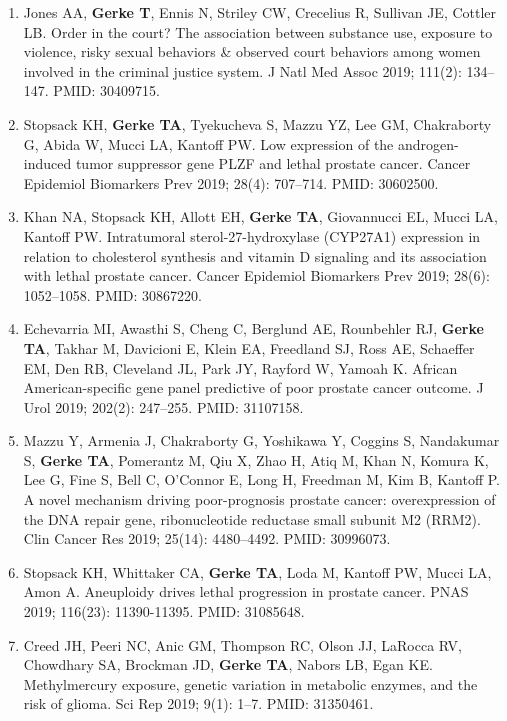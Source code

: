 \documentclass[11pt, a4paper]{article} %
\begin{document}
\begin{enumerate}[leftmargin=*]
\item{} Jones AA, {\bf Gerke T}, Ennis N, Striley CW, Crecelius R, Sullivan JE, Cottler LB. Order in the court? The association between substance use, exposure to violence, risky sexual behaviors \& observed court behaviors among women involved in the criminal justice system. J Natl Med Assoc 2019; 111(2): 134--147. PMID: 30409715. 

\item{} Stopsack KH, {\bf Gerke TA}, Tyekucheva S, Mazzu YZ, Lee GM, Chakraborty G, Abida W, Mucci LA, Kantoff PW. Low expression of the androgen-induced tumor suppressor gene PLZF and lethal prostate cancer. Cancer Epidemiol Biomarkers Prev 2019; 28(4): 707--714. PMID: 30602500. 

\item{} Khan NA, Stopsack KH, Allott EH, {\bf Gerke TA}, Giovannucci EL, Mucci LA, Kantoff PW. Intratumoral sterol-27-hydroxylase (CYP27A1) expression in relation to cholesterol synthesis and vitamin D signaling and its association with lethal prostate cancer. Cancer Epidemiol Biomarkers Prev 2019; 28(6): 1052--1058. PMID: 30867220.

\item{} Echevarria MI, Awasthi S, Cheng C, Berglund AE, Rounbehler RJ, {\bf Gerke TA}, Takhar M, Davicioni E, Klein EA, Freedland SJ, Ross AE, Schaeffer EM, Den RB, Cleveland JL, Park JY, Rayford W, Yamoah K. African American-specific gene panel predictive of poor prostate cancer outcome. J Urol 2019; 202(2): 247--255. PMID: 31107158.

\item{} Mazzu Y, Armenia J, Chakraborty G, Yoshikawa Y, Coggins S, Nandakumar S, {\bf Gerke TA}, Pomerantz M, Qiu X, Zhao H, Atiq M, Khan N, Komura K, Lee G, Fine S, Bell C, O'Connor E, Long H, Freedman M, Kim B, Kantoff P. A novel mechanism driving poor-prognosis prostate cancer: overexpression of the DNA repair gene, ribonucleotide reductase small subunit M2 (RRM2). Clin Cancer Res 2019; 25(14): 4480--4492. PMID: 30996073.

\item{} Stopsack KH, Whittaker CA, {\bf Gerke TA}, Loda M, Kantoff PW, Mucci LA, Amon A. Aneuploidy drives lethal progression in prostate cancer. PNAS 2019; 116(23): 11390-11395. PMID: 31085648. 

\item{} Creed JH, Peeri NC, Anic GM, Thompson RC, Olson JJ, LaRocca RV, Chowdhary SA, Brockman JD, {\bf Gerke TA}, Nabors LB, Egan KE. Methylmercury exposure, genetic variation in metabolic enzymes, and the risk of glioma. Sci Rep 2019; 9(1): 1--7. PMID: 31350461. 


\end{enumerate}
\end{document}
